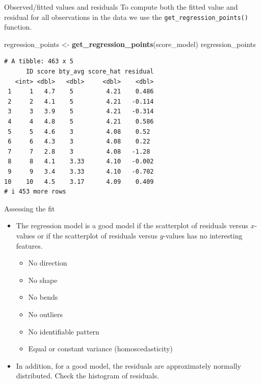 \documentclass[
  ignorenonframetext,
]{beamer}
\newenvironment{Shaded}{\begin{snugshade}}{\end{snugshade}}
\newcommand{\FunctionTok}[1]{\textcolor[rgb]{0.13,0.29,0.53}{\textbf{#1}}}
\newcommand{\NormalTok}[1]{#1}
\newcommand{\OtherTok}[1]{\textcolor[rgb]{0.56,0.35,0.01}{#1}}
\providecommand{\tightlist}{%
  \setlength{\itemsep}{0pt}\setlength{\parskip}{0pt}}
\begin{document}
\begin{frame}[fragile]{Observed/fitted values and residuals}
\label{observedfitted-values-and-residuals-2}
To compute both the fitted value and residual for all observations in
the data we use the \texttt{get\_regression\_points()} function.

\small

\begin{Shaded}
\begin{Highlighting}[]
\NormalTok{regression\_points }\OtherTok{\textless{}{-}} \FunctionTok{get\_regression\_points}\NormalTok{(score\_model)}
\NormalTok{regression\_points}
\end{Highlighting}
\end{Shaded}

\begin{verbatim}
# A tibble: 463 x 5
      ID score bty_avg score_hat residual
   <int> <dbl>   <dbl>     <dbl>    <dbl>
 1     1   4.7    5         4.21    0.486
 2     2   4.1    5         4.21   -0.114
 3     3   3.9    5         4.21   -0.314
 4     4   4.8    5         4.21    0.586
 5     5   4.6    3         4.08    0.52 
 6     6   4.3    3         4.08    0.22 
 7     7   2.8    3         4.08   -1.28 
 8     8   4.1    3.33      4.10   -0.002
 9     9   3.4    3.33      4.10   -0.702
10    10   4.5    3.17      4.09    0.409
# i 453 more rows
\end{verbatim}

\normalsize
\end{frame}

\begin{frame}{Assessing the fit}
\label{assessing-the-fit}
\begin{itemize}
\item
  The regression model is a good model if the scatterplot of residuals
  versus \(x\)-values or if the scatterplot of residuals versus
  \(\hat{y}\)-values has no interesting features.

  \begin{itemize}
  \tightlist
  \item
    No direction
  \item
    No shape
  \item
    No bends
  \item
    No outliers
  \item
    No identifiable pattern
  \item
    Equal or constant variance (homoscedasticity)
  \end{itemize}
\item
  In addition, for a good model, the residuals are approximately
  normally distributed. Check the histogram of residuals.
\end{itemize}
\end{frame}
\end{document}

